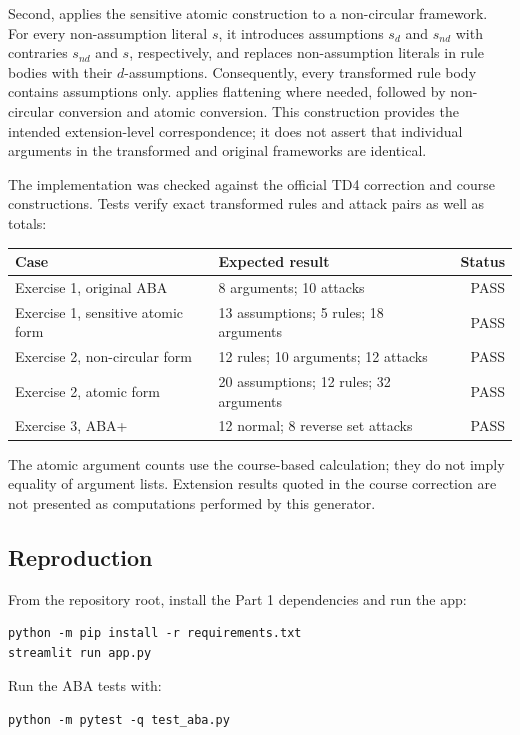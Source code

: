 \documentclass[11pt,a4paper]{article}
\newcommand{\code}[1]{\texttt{\detokenize{#1}}}
\begin{document}
Second, \code{to_atomic()} applies the sensitive atomic construction to a non-circular framework. For every non-assumption literal $s$, it introduces assumptions $s_d$ and $s_{nd}$ with contraries $s_{nd}$ and $s$, respectively, and replaces non-assumption literals in rule bodies with their $d$-assumptions. Consequently, every transformed rule body contains assumptions only. \code{prepare()} applies flattening where needed, followed by non-circular conversion and atomic conversion. This construction provides the intended extension-level correspondence; it does not assert that individual arguments in the transformed and original frameworks are identical.

The implementation was checked against the official TD4 correction and course constructions. Tests verify exact transformed rules and attack pairs as well as totals:
\begin{center}
\small
\begin{tabularx}{\linewidth}{lXr}
\toprule
Case & Expected result & Status \\
\midrule
Exercise 1, original ABA & 8 arguments; 10 attacks & PASS \\
Exercise 1, sensitive atomic form & 13 assumptions; 5 rules; 18 arguments & PASS \\
Exercise 2, non-circular form & 12 rules; 10 arguments; 12 attacks & PASS \\
Exercise 2, atomic form & 20 assumptions; 12 rules; 32 arguments & PASS \\
Exercise 3, ABA+ & 12 normal; 8 reverse set attacks & PASS \\
\bottomrule
\end{tabularx}
\end{center}
The atomic argument counts use the course-based calculation; they do not imply equality of argument lists. Extension results quoted in the course correction are not presented as computations performed by this generator.

\subsection{Reproduction}

From the repository root, install the Part 1 dependencies and run the app:
\begin{verbatim}
python -m pip install -r requirements.txt
streamlit run app.py
\end{verbatim}
Run the ABA tests with:
\begin{verbatim}
python -m pytest -q test_aba.py
\end{verbatim}
\end{document}
